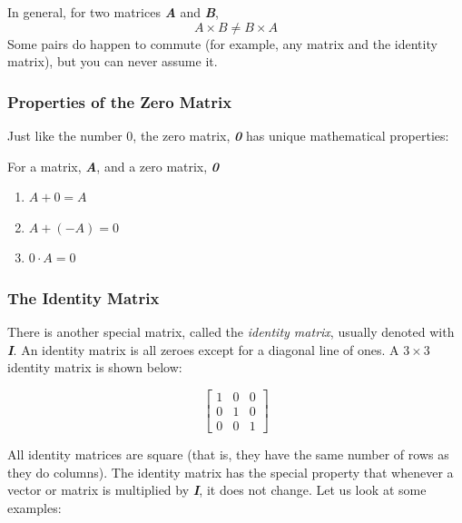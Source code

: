 \begin{mdframed}[style = important, frametitle = {Non-Commutation of Matrix Multiplication}]
In general, for two matrices \textbf{\textit{A}} and \textbf{\textit{B}},
$$\mathbf{\mathit{A}} \times \mathbf{\mathit{B}} \neq \mathbf{\mathit{B}}
\times \mathbf{\mathit{A}}$$
Some pairs do happen to commute (for example, any matrix and the identity
matrix), but you can never assume it.
\end{mdframed}

\subsubsection{Properties of the Zero Matrix}
Just like the number 0, the zero matrix, \textbf{\textit{0}} has unique
mathematical properties:
\begin{mdframed}[style = important, frametitle = {Properties of the Zero Matrix}]
For a matrix, \textbf{\textit{A}}, and a zero matrix, \textbf{\textit{0}}
\begin{enumerate}
\item $\mathbf{\mathit{A}} + \mathbf{\mathit{0}} = \mathbf{\mathit{A}}$
\item $\mathbf{\mathit{A}} + (-\mathbf{\mathit{A}}) = \mathbf{\mathit{0}}$
\item $0 \cdot \mathbf{\mathit{A}} = \mathbf{\mathit{0}}$
\end{enumerate}
\end{mdframed}

\subsubsection{The Identity Matrix}
There is another special matrix, called the \textit{identity matrix}, usually denoted with \textbf{\textit{I}}. An identity matrix
is all zeroes except for a diagonal line of ones. A $3 \times 3$ identity
matrix is shown below:

$$\begin{bmatrix}
1 & 0 & 0\\
0 & 1 & 0\\
0 & 0 & 1
\end{bmatrix}$$

All identity matrices are square (that is, they have the same number of rows
as they do columns). The identity matrix has the special property that
whenever a vector or matrix is multiplied by \textbf{\textit{I}}, it does not
change. Let us look at some examples:

